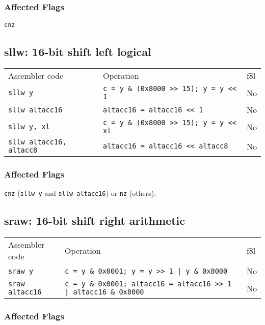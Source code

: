 \documentclass{book}
\begin{document}
\subsubsection*{Affected Flags}

\texttt{cnz}


\subsection{sllw: 16-bit shift left logical}

\begin{tabular}{l l l}
Assembler code                  & Operation                                     & f8l \\
\texttt{sllw y}                 & \texttt{c = y \& (0x8000 >> 15); y = y << 1}  & No \\
\texttt{sllw altacc16}          & \texttt{altacc16 = altacc16 << 1}             & No \\
\texttt{sllw y, xl}             & \texttt{c = y \& (0x8000 >> 15); y = y << xl} & No \\
\texttt{sllw altacc16, altacc8} & \texttt{altacc16 = altacc16 << altacc8}       & No \\
\end{tabular}

\subsubsection*{Affected Flags}

\texttt{cnz} (\texttt{sllw y} and \texttt{sllw altacc16}) or \texttt{nz} (others).


\subsection{sraw: 16-bit shift right arithmetic}

\begin{tabular}{l l l}
Assembler code         & Operation                                                               & f8l \\
\texttt{sraw y}        & \texttt{c = y \& 0x0001; y = y >> 1 | y \& 0x8000}                      & No \\
\texttt{sraw altacc16} & \texttt{c = y \& 0x0001; altacc16 = altacc16 >> 1 | altacc16 \& 0x8000} & No \\
\end{tabular}

\subsubsection*{Affected Flags}
\end{document}
